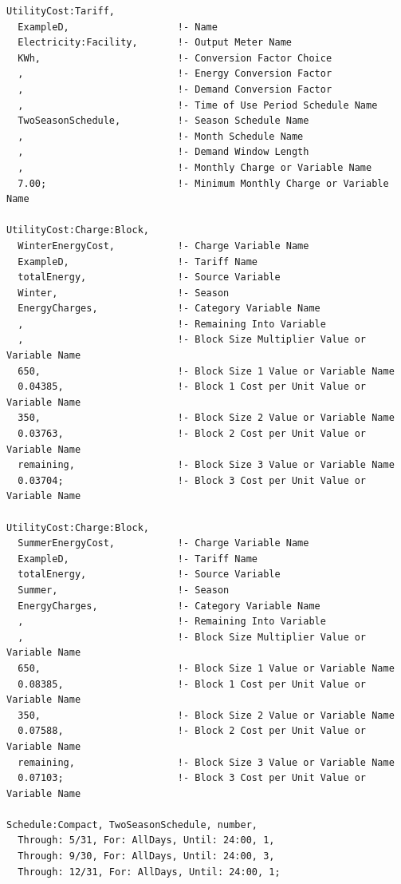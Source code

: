 \begin{lstlisting}
UtilityCost:Tariff,
  ExampleD,                   !- Name
  Electricity:Facility,       !- Output Meter Name
  KWh,                        !- Conversion Factor Choice
  ,                           !- Energy Conversion Factor
  ,                           !- Demand Conversion Factor
  ,                           !- Time of Use Period Schedule Name
  TwoSeasonSchedule,          !- Season Schedule Name
  ,                           !- Month Schedule Name
  ,                           !- Demand Window Length
  ,                           !- Monthly Charge or Variable Name
  7.00;                       !- Minimum Monthly Charge or Variable Name

UtilityCost:Charge:Block,
  WinterEnergyCost,           !- Charge Variable Name
  ExampleD,                   !- Tariff Name
  totalEnergy,                !- Source Variable
  Winter,                     !- Season
  EnergyCharges,              !- Category Variable Name
  ,                           !- Remaining Into Variable
  ,                           !- Block Size Multiplier Value or Variable Name
  650,                        !- Block Size 1 Value or Variable Name
  0.04385,                    !- Block 1 Cost per Unit Value or Variable Name
  350,                        !- Block Size 2 Value or Variable Name
  0.03763,                    !- Block 2 Cost per Unit Value or Variable Name
  remaining,                  !- Block Size 3 Value or Variable Name
  0.03704;                    !- Block 3 Cost per Unit Value or Variable Name

UtilityCost:Charge:Block,
  SummerEnergyCost,           !- Charge Variable Name
  ExampleD,                   !- Tariff Name
  totalEnergy,                !- Source Variable
  Summer,                     !- Season
  EnergyCharges,              !- Category Variable Name
  ,                           !- Remaining Into Variable
  ,                           !- Block Size Multiplier Value or Variable Name
  650,                        !- Block Size 1 Value or Variable Name
  0.08385,                    !- Block 1 Cost per Unit Value or Variable Name
  350,                        !- Block Size 2 Value or Variable Name
  0.07588,                    !- Block 2 Cost per Unit Value or Variable Name
  remaining,                  !- Block Size 3 Value or Variable Name
  0.07103;                    !- Block 3 Cost per Unit Value or Variable Name

Schedule:Compact, TwoSeasonSchedule, number,
  Through: 5/31, For: AllDays, Until: 24:00, 1,
  Through: 9/30, For: AllDays, Until: 24:00, 3,
  Through: 12/31, For: AllDays, Until: 24:00, 1;
\end{lstlisting}

